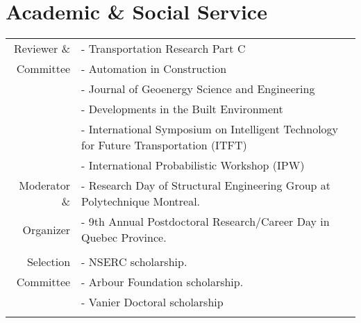 \documentclass[10pt]{article}
\begin{document}
\section{Academic \& Social Service}
\begin{tabular}{r|p{16cm}}
Reviewer \&&{- Transportation Research Part C}\\
Committee &{- Automation in Construction}\\&
{- Journal of Geoenergy Science and Engineering}\\&
{- Developments in the Built Environment}\\&
{- International Symposium on Intelligent Technology for Future Transportation (ITFT)}\\&
{- International Probabilistic Workshop (IPW)}\multicolumn{2}{c}{} \\
 Moderator \& &{- Research Day of Structural Engineering Group at Polytechnique Montreal.}\\
Organizer&{- 9th Annual Postdoctoral Research/Career Day in Quebec Province.}
\\\multicolumn{2}{c}{}\\
 Selection &{- NSERC scholarship.}\\
Committee&{- Arbour Foundation scholarship.}\\&
{- Vanier Doctoral scholarship}
\\\multicolumn{2}{c}{}
\end{tabular}
\end{document}

